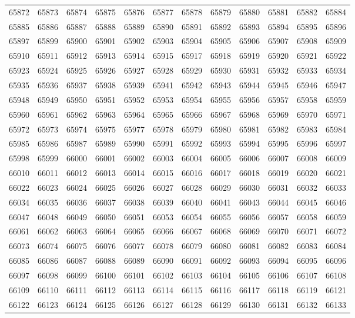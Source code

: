 \begin{center}
\begin{longtable}{llllllllllll}
65872 &65873 &65874 &65875 &65876 &65877 &65878 &65879 &65880 &65881 &65882 &65884 \\
65885 &65886 &65887 &65888 &65889 &65890 &65891 &65892 &65893 &65894 &65895 &65896 \\
65897 &65899 &65900 &65901 &65902 &65903 &65904 &65905 &65906 &65907 &65908 &65909 \\
65910 &65911 &65912 &65913 &65914 &65915 &65917 &65918 &65919 &65920 &65921 &65922 \\
65923 &65924 &65925 &65926 &65927 &65928 &65929 &65930 &65931 &65932 &65933 &65934 \\
65935 &65936 &65937 &65938 &65939 &65941 &65942 &65943 &65944 &65945 &65946 &65947 \\
65948 &65949 &65950 &65951 &65952 &65953 &65954 &65955 &65956 &65957 &65958 &65959 \\
65960 &65961 &65962 &65963 &65964 &65965 &65966 &65967 &65968 &65969 &65970 &65971 \\
65972 &65973 &65974 &65975 &65977 &65978 &65979 &65980 &65981 &65982 &65983 &65984 \\
65985 &65986 &65987 &65989 &65990 &65991 &65992 &65993 &65994 &65995 &65996 &65997 \\
65998 &65999 &66000 &66001 &66002 &66003 &66004 &66005 &66006 &66007 &66008 &66009 \\
66010 &66011 &66012 &66013 &66014 &66015 &66016 &66017 &66018 &66019 &66020 &66021 \\
66022 &66023 &66024 &66025 &66026 &66027 &66028 &66029 &66030 &66031 &66032 &66033 \\
66034 &66035 &66036 &66037 &66038 &66039 &66040 &66041 &66043 &66044 &66045 &66046 \\
66047 &66048 &66049 &66050 &66051 &66053 &66054 &66055 &66056 &66057 &66058 &66059 \\
66061 &66062 &66063 &66064 &66065 &66066 &66067 &66068 &66069 &66070 &66071 &66072 \\
66073 &66074 &66075 &66076 &66077 &66078 &66079 &66080 &66081 &66082 &66083 &66084 \\
66085 &66086 &66087 &66088 &66089 &66090 &66091 &66092 &66093 &66094 &66095 &66096 \\
66097 &66098 &66099 &66100 &66101 &66102 &66103 &66104 &66105 &66106 &66107 &66108 \\
66109 &66110 &66111 &66112 &66113 &66114 &66115 &66116 &66117 &66118 &66119 &66121 \\
66122 &66123 &66124 &66125 &66126 &66127 &66128 &66129 &66130 &66131 &66132 &66133 \\

\end{longtable}
\end{center}
